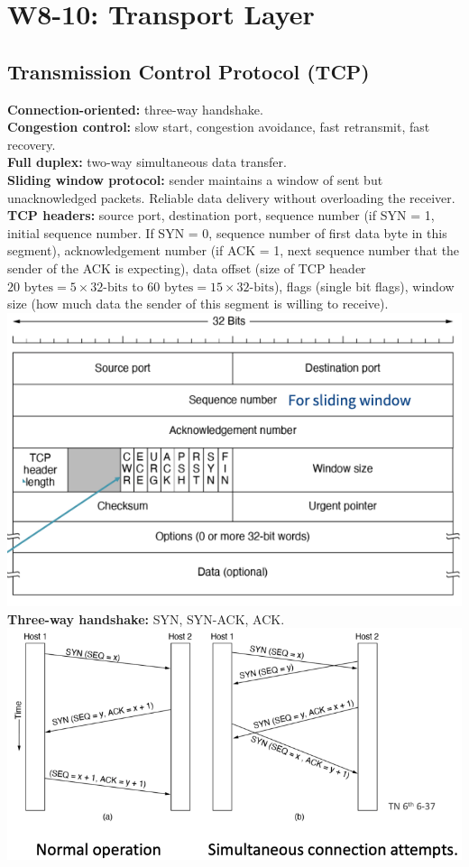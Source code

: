 \section{W8-10: Transport Layer}

\subsection{Transmission Control Protocol (TCP)}
\textbf{Connection-oriented:} three-way handshake.\\
\textbf{Congestion control:} slow start, congestion avoidance, fast retransmit, fast recovery.\\
\textbf{Full duplex:} two-way simultaneous data transfer.\\
\textbf{Sliding window protocol:} sender maintains a window of sent but unacknowledged packets. Reliable data delivery without overloading the receiver.\\
\textbf{TCP headers:} source port, destination port, sequence number (if SYN = 1, initial sequence number. If SYN = 0, sequence number of first data byte in this segment), acknowledgement number (if ACK = 1, next sequence number that the sender of the ACK is expecting), data offset (size of TCP header $20 \text{ bytes} = 5 \times 32 \text{-bits}$ to $60 \text{ bytes} = 15 \times 32 \text{-bits}$), flags (single bit flags), window size (how much data the sender of this segment is willing to receive).\\
\includegraphics[width=\linewidth]{figs/tcp-header.png}
\textbf{Three-way handshake:} SYN, SYN-ACK, ACK.\\
\includegraphics[width=\linewidth]{figs/three-way-handshake.png}

